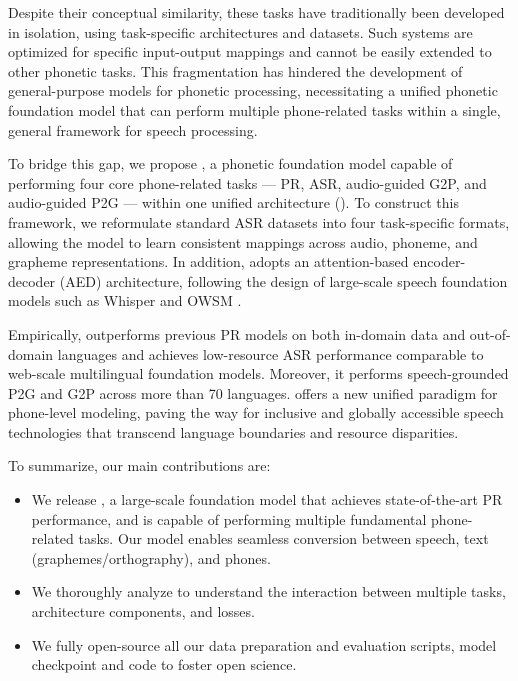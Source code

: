 Despite their conceptual similarity, these tasks have traditionally been developed in isolation, using task-specific architectures and datasets. 
Such systems are optimized for specific input-output mappings and cannot be easily extended to other phonetic tasks.
This fragmentation has hindered the development of general-purpose models for phonetic processing, necessitating a unified phonetic foundation model that can perform multiple phone-related tasks within a single, general framework for speech processing.

To bridge this gap, we propose \POWSM, a phonetic foundation model capable of performing four core phone-related tasks --- PR, ASR, audio-guided G2P, and audio-guided P2G --- within one unified architecture (). 
To construct this framework, we reformulate standard ASR datasets \cite{zhu-etal-2025-zipa} into four task-specific formats, allowing the model to learn consistent mappings across audio, phoneme, and grapheme representations.
In addition, \POWSM adopts an attention-based encoder-decoder (AED) architecture, following the design of large-scale speech foundation models such as Whisper \citep{radford2023robust} and OWSM \citep{peng2023reproducing}.

Empirically, \POWSM outperforms previous PR models on both in-domain data and out-of-domain languages and  achieves low-resource ASR performance comparable to web-scale multilingual foundation models. Moreover, it performs speech-grounded P2G and G2P across more than 70 languages.
\POWSM offers a new unified paradigm for phone-level modeling, paving the way for inclusive and globally accessible speech technologies that transcend language boundaries and resource disparities.

To summarize, our main contributions are: 
\begin{itemize}
    \item We release \POWSM, a large-scale foundation model that achieves state-of-the-art PR performance, and is capable of performing multiple fundamental phone-related tasks. Our model enables seamless conversion between speech, text (graphemes/orthography), and phones.
    \item We thoroughly analyze \POWSM to understand the interaction between multiple tasks, architecture components, and losses.
    \item We fully open-source all our data preparation and evaluation scripts, model checkpoint and code to foster open science.
\end{itemize}

